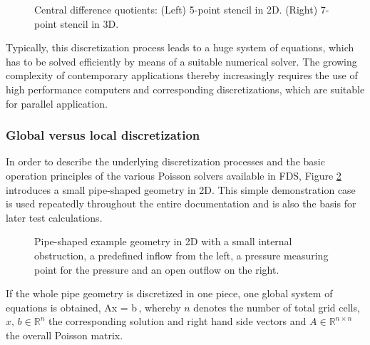 \begin{figure}[htb]
\begin{center}
%
\begin{minipage}[htb]{0.6\textwidth}

\end{minipage}
\hspace{-1.5cm}
\begin{minipage}[htb]{0.25\textwidth}

\vspace{-0.6cm}
\end{minipage}
%
\caption{Central difference quotients: (Left) 5-point stencil in 2D. (Right) 7-point stencil in 3D.}
\label{FIG_SCARC_five_point_stencil}
\end{center}
\end{figure}

Typically, this discretization process leads to a huge system of equations, which has to be solved efficiently by means of a suitable numerical solver.
The growing complexity of contemporary applications thereby increasingly requires the use of high performance computers and corresponding discretizations, which are suitable for parallel application.

\subsubsection{Global versus local discretization}
\label{SEC_SCARC_poisson_global_vs_local}
In order to describe the underlying discretization processes and the basic operation principles of the various Poisson solvers available in FDS,
Figure \ref{FIG_SCARC_basic_pipe_geometry} introduces a small pipe-shaped geometry in 2D. This simple demonstration case is used repeatedly throughout the entire documentation and is also the basis for later test calculations.
\begin{figure}[ht]
\begin{center}

\end{center}
\caption[Pipe-shaped geometry in 2D]{Pipe-shaped example geometry in 2D with a small internal obstruction,
a predefined inflow from the left, a pressure measuring point for the pressure and an open outflow on the right.}
\label{FIG_SCARC_basic_pipe_geometry}
\end{figure}

If the whole pipe geometry is discretized in one piece, one global system of equations is obtained,
\be 
  Ax = b\,, 
  \label{EQ_SCARC_single_system}
\ee
whereby $n$ denotes the number of total grid cells, 
$x, \,b\in\mathbb{R}^n$ the corresponding solution and right hand side vectors and $A \in \mathbb{R}^{n \times n}$ the overall Poisson matrix. 


